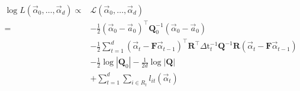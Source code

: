\documentclass[10pt]{article} %
\begin{document}
\color{fgC}\[\newcommand{\mat}[1]{\mathbf{#1}}
%
\newcommand{\Lparen}[1]{\left( #1\right)}
\newcommand{\Lbrace}[1]{\left\{ #1\right\}}
\newcommand{\LVert}[1]{\left\rVert #1\right\lVert}
%
\newcommand{\Cond}[2]{\left. #1 \vphantom{#2} \right\vert  #2}
\newcommand{\propp}[1]{\Prob\Lparen{#1}}
\newcommand{\proppCond}[2]{\propp{\Cond{#1}{#2}}}
%
\newcommand{\expecp}[1]{\E\Lparen{#1}}
\newcommand{\expecpCond}[2]{\expecp{\Cond{#1}{#2}}}
%
\newcommand{\varp}[1]{\VAR\Lparen{#1}}
\newcommand{\varpCond}[2]{\varp{\Cond{#1}{#2}}}
%
\newcommand{\likep}[1]{L\Lparen{#1}}
\newcommand{\likepCond}[2]{\likep{\Cond{#1}{#2}}}
%
\newcommand{\hvec}[1]{\widehat{\vec{#1}}}
\newcommand{\hmat}[1]{\widehat{\mat{#1}}}
\newcommand{\tvec}[1]{\tilde{\vec{#1}}}
\newcommand{\tmat}[1]{\tilde{\mat{#1}}}
%
\newcommand{\diag}[1]{\text{diag}{\Lparen{#1}}}
\newcommand{\deter}[1]{\left| #1 \right|}
\newcommand{\bigO}[1]{\mathcal{O}\Lparen{#1}}
%
\newcommand{\emNotee}[3]{#1_{\left. #2 \right\vert #3}}
\newcommand{\emNote}[4]{#1_{\left. #2 \right\vert #3}^{(#4)}}
%
%
\newcommand{\argmaxu}[1]{\underset{#1}{\argmax}\:}
\newcommand{\argminu}[1]{\underset{#1}{\argmin}\:}
%
\newcommand{\Prob}{P}
\newcommand{\VAR}{Var}
\newcommand{\E}{E}
%
%
%
%
\begin{aligned}
	\log L \Lparen{\vec{\alpha}_0, \dots, \vec{\alpha}_{d}} \propto &
	 \mathcal{L}\Lparen{\vec{\alpha}_0, \dots, \vec{\alpha}_{d}}
		 \\
		= & - \frac{1}{2} \Lparen{\vec{\alpha}_0 - \vec{a}_0}^\top \mat{Q}^{-1}_0\Lparen{\vec{\alpha}_0 - \vec{a}_0} \\
	&  - \frac{1}{2} \sum_{t = 1}^d \Lparen{\vec{\alpha}_t - \mat{F}\vec{\alpha}_{t - 1}}^\top\mat{R}^\top\Delta \mathrm{t}_t^{-1}\mat{Q}^{-1}\mat{R}\Lparen{\vec{\alpha}_t - \mat{F}\vec{\alpha}_{t - 1}} \\
	&  - \frac{1}{2} \log \deter{\mat{Q}_0} - \frac{1}{2d} \log \deter{\mat{Q}} \\
	&  + \sum_{t = 1}^d \sum_{i \in R_t} l_{it}({\vec{\alpha}_t})
\end{aligned}\]
\end{document}
